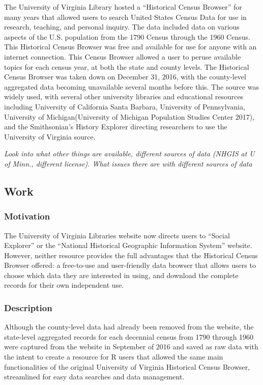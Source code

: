 \documentclass[11pt,]{article}
\begin{document}
The University of Virginia Library hosted a ``Historical Census
Browser'' for many years that allowed users to search United States
Census Data for use in research, teaching, and personal inquiry. The
data included data on various aspects of the U.S. population from the
1790 Census through the 1960 Census. This Historical Census Browser was
free and available for use for anyone with an internet connection. This
Census Browser allowed a user to peruse available topics for each census
year, at both the state and county levels. The Historical Census Browser
was taken down on December 31, 2016, with the county-level aggregated
data becoming unavailable several months before this. The source was
widely used, with several other university libraries and educational
resources including University of California Santa Barbara, University
of Pennsylvania, University of Michigan(University of Michigan
Population Studies Center 2017), and the Smithsonian's History Explorer
directing researchers to use the University of Virginia source.

\emph{Look into what other things are available, different sources of
data (NHGIS at U of Minn., different license). What issues there are
with different sources of data}

\subsection{Work}\label{work}

\subsubsection{Motivation}\label{motivation}

The University of Virginia Libraries website now directs users to
``Social Explorer'' or the ``National Historical Geographic Information
System'' website. However, neither resource provides the full advantages
that the Historical Census Browser offered: a free-to-use and
user-friendly data browser that allows users to choose which data they
are interested in using, and download the complete records for their own
independent use.

\subsubsection{Description}\label{description}

Although the county-level data had already been removed from the
website, the state-level aggregated records for each decennial census
from 1790 through 1960 were captured from the website in September of
2016 and saved as raw data with the intent to create a resource for R
users that allowed the same main functionalities of the original
University of Virginia Historical Census Browser, streamlined for easy
data searches and data management.
\end{document}
